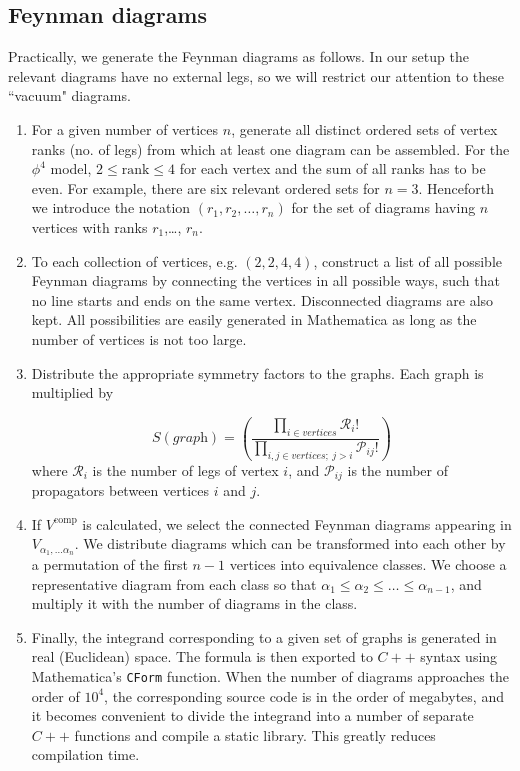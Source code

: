 \documentclass[twocolumn,secnumarabic,amssymb, nobibnotes, aps, prd]{revtex4-2}
\newcommand{\be}{\begin{equation}}
\newcommand{\ee}{\end{equation}}
\begin{document}
\subsection{Feynman diagrams} \label{FeynApp}
Practically, we generate the Feynman diagrams as follows. In our setup the relevant diagrams have no external legs, so we will restrict our attention to these ``vacuum" diagrams.
\begin{enumerate}
\item For a given number of vertices $n$, generate all distinct ordered sets
of vertex ranks (no. of legs) from which at least one diagram can be assembled.
For the $\phi^4$ model, $2\leq\text{rank}\leq4$ for each vertex and the sum of all ranks has to be even.
For example, there are six relevant ordered sets for $n=3$.
Henceforth we introduce the notation $(r_1,r_2,\dots,r_n)$ for the set of diagrams
having $n$ vertices with ranks $r_1$,\dots, $r_n$.

\item To each collection of vertices, e.g. $\left(2,2,4,4\right)$, construct
a list of all possible Feynman diagrams by connecting the vertices
in all possible ways, such that no line starts and ends on the same
vertex. Disconnected diagrams
are also kept. All possibilities are easily generated in Mathematica
as long as the number of vertices is not too large.

\item Distribute the appropriate symmetry factors to the graphs. Each graph
is multiplied by

\be
S(\textit{graph}) =\left(\frac{\prod_{i\in\textit{vertices}}\mathcal{R}_i!}{\prod_{i,j\in\textit{vertices};\:j>i}\mathcal{P}_{ij}!}\right)
\ee
where $\mathcal{R}_i$ is the number of legs of vertex $i$, and $\mathcal{P}_{ij }$ is the number of propagators between vertices $i$ and $j$.
\item If $V^{\mathrm{comp}}$ is calculated,  we select the connected Feynman diagrams appearing in $V_{\alpha_1,\dots \alpha_n}$. We distribute diagrams which can be transformed into each other by a permutation of the first $n-1$ vertices into equivalence classes. We choose a representative diagram from each class so that $\alpha_1\leq \alpha_2\leq \dots\leq \alpha_{n-1}$, and multiply it with the number of diagrams in the class.
\item
Finally, the integrand corresponding to a given set of graphs is generated
in real (Euclidean) space.
The formula is then exported to $C++$ syntax using Mathematica's \texttt{CForm} function.
When the number of diagrams approaches the order of $10^4$, the corresponding
source code is in the order of megabytes, and it becomes convenient to
divide the integrand into a number of separate $C++$ functions and compile a static library.
This greatly reduces compilation time.

\end{enumerate}
\end{document}
